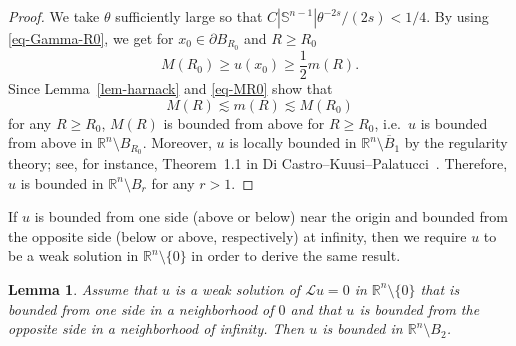 \documentclass[11pt]{amsart}
\theoremstyle{plain}
\newtheorem{lemma}[theorem]{Lemma}
\theoremstyle{definition}
\numberwithin{equation}{section}
\begin{document}
\begin{proof}
We take $\theta$ sufficiently large so that $C|\mathbb{S}^{n-1}|\theta^{-2s}/(2s) <1/4$. By using \eqref{eq-Gamma-R0}, we get for $x_0 \in \partial B_{R_0}$ and $R \geq R_0$
\begin{equation}\label{eq-MR0}
    M(R_0) \geq u(x_0) \geq \frac{1}{2}m(R).
\end{equation}
Since Lemma~\ref{lem-harnack} and \eqref{eq-MR0} show that
\begin{equation*}
M(R) \lesssim m(R) \lesssim M(R_0)
\end{equation*}
for any $R\geq R_0$, $M(R)$ is bounded from above for $R \geq R_0$, i.e.\ $u$ is bounded from above in $\mathbb{R}^n \setminus B_{R_0}$. Moreover, $u$ is locally bounded in $\mathbb{R}^n \setminus \overline{B}_1$ by the regularity theory; see, for instance, Theorem~1.1 in Di Castro--Kuusi--Palatucci~\cite{DCKP16}. Therefore, $u$ is bounded in $\mathbb{R}^n \setminus B_r$ for any $r>1$.
\end{proof}

If $u$ is bounded from one side (above or below) near the origin and bounded from the opposite side (below or above, respectively) at infinity, then we require $u$ to be a weak solution in $\mathbb{R}^n \setminus \{0\}$ in order to derive the same result.

\begin{lemma}\label{lem-bdd2}
Assume that $u$ is a weak solution of $\mathcal{L}u=0$ in $\mathbb{R}^n \setminus \{0\}$ that is bounded from one side in a neighborhood of $0$ and that $u$ is bounded from the opposite side in a neighborhood of infinity. Then $u$ is bounded in $\mathbb{R}^n \setminus B_2$.
\end{lemma}
\end{document}
